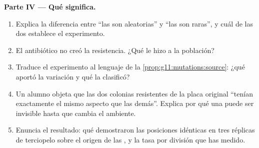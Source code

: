 \begin{problem}
\medskip
\noindent\textbf{Parte IV --- Qué significa.}
\begin{enumerate}[resume]
  \item Explica la diferencia entre ``las  son aleatorias'' y
        ``las  son raras'', y cuál de las dos establece el
        experimento.
  \item El antibiótico no creó la resistencia. ¿Qué le hizo a la
        población?
  \item Traduce el experimento al lenguaje de la
        \cref{prop:g11:mutations:source}: ¿qué aportó la variación y
        qué la clasificó?
  \item Un alumno objeta que las dos colonias resistentes de la placa
        original ``tenían exactamente el mismo aspecto que las demás''.
        Explica por qué una  puede ser invisible hasta que
        cambia el ambiente.
  \item Enuncia el resultado: qué demostraron las posiciones idénticas
        en tres réplicas de terciopelo sobre el origen de las
        , y la tasa por división que has medido.
\end{enumerate}
\end{problem}

